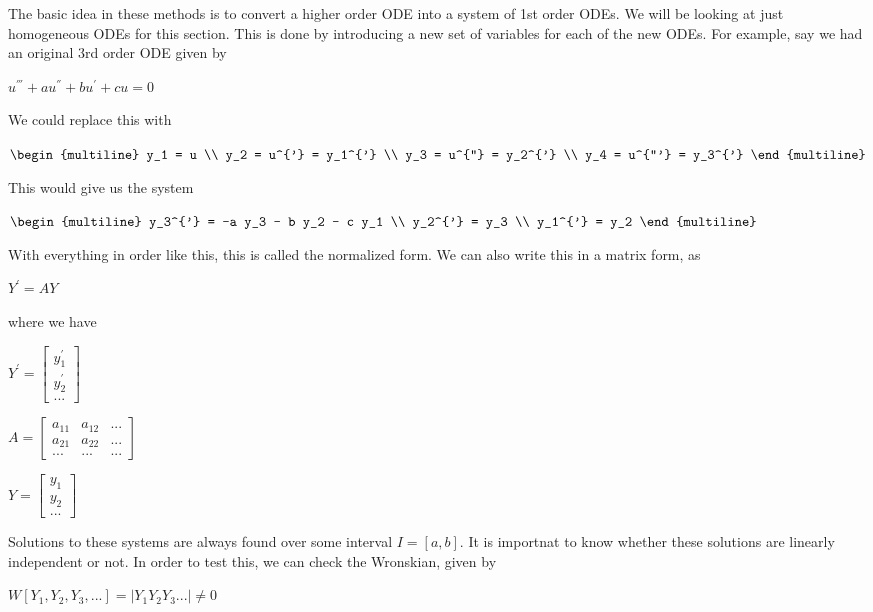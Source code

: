 \documentclass[
  letterpaper,
]{report}
\begin{document}
The basic idea in these methods is to convert a higher order ODE into a
system of 1st order ODEs. We will be looking at just homogeneous ODEs
for this section. This is done by introducing a new set of variables for
each of the new ODEs. For example, say we had an original 3rd order ODE
given by

\(u^{'''} + a u^{''} + b u^{'} + c u = 0\)

We could replace this with

\(\begin{multiline}
y_1 = u \\
y_2 = u^{'} = y_1^{'} \\
y_3 = u^{''} = y_2^{'} \\
y_4 = u^{'''} = y_3^{'}
\end{multiline}\)

This would give us the system

\(\begin{multiline}
y_3^{'} = -a y_3 - b y_2 - c y_1 \\
y_2^{'} = y_3 \\
y_1^{'} = y_2
\end{multiline}\)

With everything in order like this, this is called the normalized form.
We can also write this in a matrix form, as

\(Y^{'} = A Y\)

where we have

\(Y^{'} = \begin{bmatrix} y_1^{'} \\ y_2^{'} \\ ... \end{bmatrix}\)

\(A = \begin{bmatrix} a_{11} & a_{12} & ... \\ a_{21} & a_{22} & ... \\ ... & ... & ... \end{bmatrix}\)

\(Y = \begin{bmatrix} y_1 \\ y_2 \\ ... \end{bmatrix}\)

Solutions to these systems are always found over some interval
\(I = [a,b]\). It is importnat to know whether these solutions are
linearly independent or not. In order to test this, we can check the
Wronskian, given by

\(W[Y_1, Y_2, Y_3, ...] = | Y_1 Y_2 Y_3 ... | \ne 0\)
\end{document}
